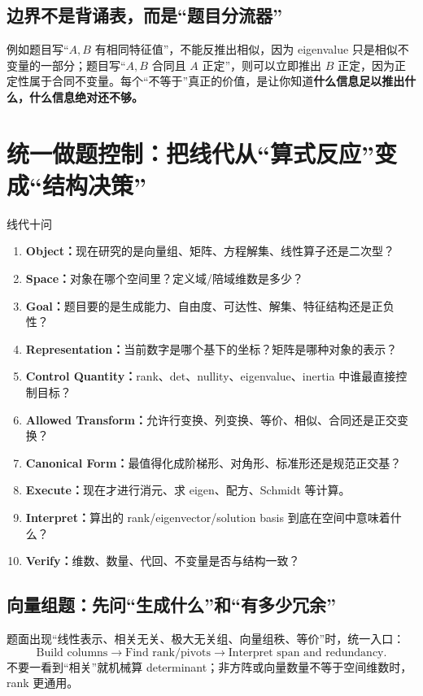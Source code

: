 \documentclass[11pt,a4paper,openany]{ctexbook}
\newcommand{\key}[1]{\textbf{\color{deep}#1}}
\begin{document}
\section{边界不是背诵表，而是“题目分流器”}
例如题目写“$A,B$ 有相同特征值”，不能反推出相似，因为 eigenvalue 只是相似不变量的一部分；题目写“$A,B$ 合同且 $A$ 正定”，则可以立即推出 $B$ 正定，因为正定性属于合同不变量。每个“不等于”真正的价值，是让你知道\key{什么信息足以推出什么，什么信息绝对还不够。}

\chapter{统一做题控制：把线代从“算式反应”变成“结构决策”}

\begin{corebox}{线代十问}
\begin{enumerate}
  \item \key{Object：}现在研究的是向量组、矩阵、方程解集、线性算子还是二次型？
  \item \key{Space：}对象在哪个空间里？定义域/陪域维数是多少？
  \item \key{Goal：}题目要的是生成能力、自由度、可达性、解集、特征结构还是正负性？
  \item \key{Representation：}当前数字是哪个基下的坐标？矩阵是哪种对象的表示？
  \item \key{Control Quantity：}rank、det、nullity、eigenvalue、inertia 中谁最直接控制目标？
  \item \key{Allowed Transform：}允许行变换、列变换、等价、相似、合同还是正交变换？
  \item \key{Canonical Form：}最值得化成阶梯形、对角形、标准形还是规范正交基？
  \item \key{Execute：}现在才进行消元、求 eigen、配方、Schmidt 等计算。
  \item \key{Interpret：}算出的 rank/eigenvector/solution basis 到底在空间中意味着什么？
  \item \key{Verify：}维数、数量、代回、不变量是否与结构一致？
\end{enumerate}
\end{corebox}

\section{向量组题：先问“生成什么”和“有多少冗余”}
题面出现“线性表示、相关无关、极大无关组、向量组秩、等价”时，统一入口：
\[
\boxed{\text{Build columns}\to\text{Find rank/pivots}\to\text{Interpret span and redundancy}.}
\]
不要一看到“相关”就机械算 determinant；非方阵或向量数量不等于空间维数时，rank 更通用。
\end{document}
